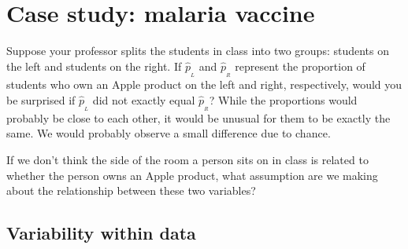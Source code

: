 %
%
%






\section{Case study: malaria vaccine}
\label{caseStudyMalariaVaccine}

\begin{examplewrap}
\begin{nexample}{Suppose your professor splits the students in class into two groups: students on the left and students on the right. If $\hat{p}_{_L}$ and $\hat{p}_{_R}$ represent the proportion of students who own an Apple product on the left and right, respectively, would you be surprised if $\hat{p}_{_L}$ did not {exactly} equal $\hat{p}_{_R}$?}\label{classRightLeftSideApple}
While the proportions would probably be close to each other, it would be unusual for them to be exactly the same. We would probably observe a small difference due to {chance}.
\end{nexample}
\end{examplewrap}

\begin{exercisewrap}
\begin{nexercise}
If we don't think the side of the room a person sits on
in class is related to whether the person owns an Apple product,
what assumption are we making about the relationship between
these two variables?\footnotemark{}
\end{nexercise}
\end{exercisewrap}


\subsection{Variability within data}
\label{variabilityWithinData}

